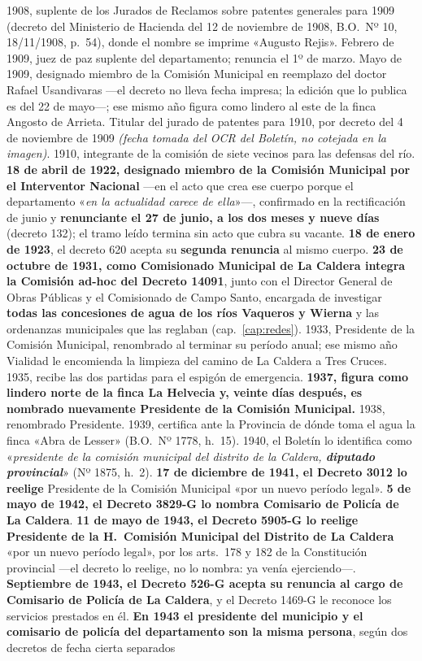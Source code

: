 \begin{personas}
\item[{\textbf{Augusto Regis\index{Regis, Augusto}}}] 1908, suplente de los Jurados de Reclamos sobre patentes generales para 1909 (decreto del Ministerio de Hacienda del 12 de noviembre de 1908, B.O.\ Nº 10, 18/11/1908, p.\ 54), donde el nombre se imprime «Augusto Rejis». Febrero de 1909, juez de paz suplente del departamento; renuncia el 1º de marzo. Mayo de 1909, designado miembro de la Comisión Municipal en reemplazo del doctor Rafael Usandivaras ---el decreto no lleva fecha impresa; la edición que lo publica es del 22 de mayo---; ese mismo año figura como lindero al este de la finca Angosto de Arrieta. Titular del jurado de patentes para 1910, por decreto del 4 de noviembre de 1909 \textit{(fecha tomada del OCR del Boletín, no cotejada en la imagen)}. 1910, integrante de la comisión de siete vecinos para las defensas del río. \textbf{18 de abril de 1922, designado miembro de la Comisión Municipal por el Interventor Nacional} ---en el acto que crea ese cuerpo porque el departamento «\textit{en la actualidad carece de ella}»---, confirmado en la rectificación de junio y \textbf{renunciante el 27 de junio, a los dos meses y nueve días} (decreto 132); el tramo leído termina sin acto que cubra su vacante. \textbf{18 de enero de 1923}, el decreto 620 acepta su \textbf{segunda renuncia} al mismo cuerpo. \textbf{23 de octubre de 1931, como Comisionado Municipal de La Caldera integra la Comisión ad-hoc del Decreto 14091}, junto con el Director General de Obras Públicas y el Comisionado de Campo Santo, encargada de investigar \textbf{todas las concesiones de agua de los ríos Vaqueros y Wierna} y las ordenanzas municipales que las reglaban (cap.\ \ref{cap:redes}). 1933, Presidente de la Comisión Municipal, renombrado al terminar su período anual; ese mismo año Vialidad le encomienda la limpieza del camino de La Caldera a Tres Cruces. 1935, recibe las dos partidas para el espigón de emergencia. \textbf{1937, figura como lindero norte de la finca La Helvecia y, veinte días después, es nombrado nuevamente Presidente de la Comisión Municipal.} 1938, renombrado Presidente. 1939, certifica ante la Provincia de dónde toma el agua la finca «Abra de Lesser» (B.O.\ Nº 1778, h.\ 15). 1940, el Boletín lo identifica como «\textit{presidente de la comisión municipal del distrito de la Caldera, \textbf{diputado provincial}}» (Nº 1875, h.\ 2). \textbf{17 de diciembre de 1941, el Decreto 3012 lo reelige} Presidente de la Comisión Municipal «por un nuevo período legal». \textbf{5 de mayo de 1942, el Decreto 3829-G lo nombra Comisario de Policía de La Caldera}. \textbf{11 de mayo de 1943, el Decreto 5905-G lo reelige Presidente de la H.\ Comisión Municipal del Distrito de La Caldera} «por un nuevo período legal», por los arts.\ 178 y 182 de la Constitución provincial ---el decreto lo reelige, no lo nombra: ya venía ejerciendo---. \textbf{Septiembre de 1943, el Decreto 526-G acepta su renuncia al cargo de Comisario de Policía de La Caldera}, y el Decreto 1469-G le reconoce los servicios prestados en él. \textbf{En 1943 el presidente del municipio y el comisario de policía del departamento son la misma persona}, según dos decretos de fecha cierta separados 
\end{personas}

